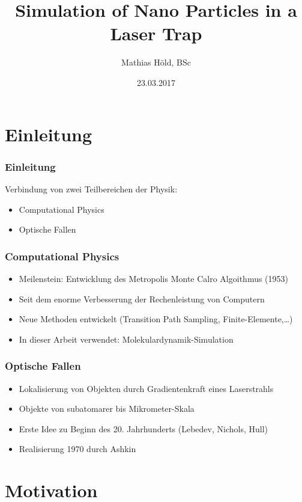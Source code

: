 \documentclass{beamer}
\begin{document}
\title{Simulation of Nano Particles in a Laser Trap}
\author{Mathias Höld, BSc}
\date{23.03.2017}
\begin{frame}
\titlepage
\end{frame}

\begin{frame}
\tableofcontents
\end{frame}

\section{Einleitung}
\begin{frame}
\frametitle{Einleitung}
Verbindung von zwei Teilbereichen der Physik:
\begin{itemize}
\item Computational Physics
\item Optische Fallen
\end{itemize}
\end{frame}

\begin{frame}
\frametitle{Computational Physics}
\begin{itemize}
\item Meilenstein: Entwicklung des Metropolis Monte Calro Algoithmus (1953)
\item Seit dem enorme Verbesserung der Rechenleistung von Computern 
\item Neue Methoden entwickelt (Transition Path Sampling, Finite-Elemente,\ldots)
\item In dieser Arbeit verwendet: Molekulardynamik-Simulation
\end{itemize}
\end{frame}

\begin{frame}
\frametitle{Optische Fallen}
\begin{itemize}
\item Lokalisierung von Objekten durch Gradientenkraft eines Laserstrahls
\item Objekte von subatomarer bis Mikrometer-Skala
\item Erste Idee zu Beginn des 20. Jahrhunderts (Lebedev, Nichols, Hull)
\item Realisierung 1970 durch Ashkin
\end{itemize}
\end{frame}

\section{Motivation}
\end{document}
